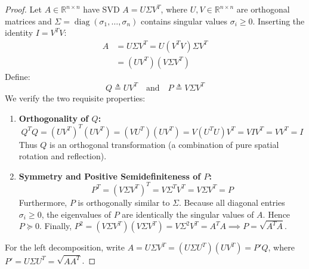 \begin{proof}
Let $A \in \mathbb{R}^{n \times n}$ have SVD $A = U \Sigma V^T$, where $U, V \in \mathbb{R}^{n \times n}$ are orthogonal matrices and $\Sigma = \operatorname{diag}(\sigma_1, \dots, \sigma_n)$ contains singular values $\sigma_i \ge 0$.
Inserting the identity $I = V^T V$:
\begin{align}
A &= U \Sigma V^T = U (V^T V) \Sigma V^T \nonumber \\
&= (U V^T) (V \Sigma V^T)
\end{align}
Define:
\begin{equation}
Q \triangleq U V^T \quad \text{and} \quad P \triangleq V \Sigma V^T
\end{equation}
We verify the two requisite properties:
\begin{enumerate}
    \item \textbf{Orthogonality of $Q$:}
    \begin{equation}
    Q^T Q = (U V^T)^T (U V^T) = (V U^T)(U V^T) = V (U^T U) V^T = V I V^T = V V^T = I
    \end{equation}
    Thus $Q$ is an orthogonal transformation (a combination of pure spatial rotation and reflection).
    \item \textbf{Symmetry and Positive Semidefiniteness of $P$:}
    \begin{equation}
    P^T = (V \Sigma V^T)^T = V \Sigma^T V^T = V \Sigma V^T = P
    \end{equation}
    Furthermore, $P$ is orthogonally similar to $\Sigma$. Because all diagonal entries $\sigma_i \ge 0$, the eigenvalues of $P$ are identically the singular values of $A$. Hence $P \succeq 0$.
    Finally, $P^2 = (V \Sigma V^T)(V \Sigma V^T) = V \Sigma^2 V^T = A^T A \implies P = \sqrt{A^T A}$.
\end{enumerate}
For the left decomposition, write $A = U \Sigma V^T = (U \Sigma U^T)(U V^T) = P' Q$, where $P' = U \Sigma U^T = \sqrt{A A^T}$.
\end{proof}

